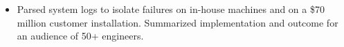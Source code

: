 \documentclass[12pt,letterpaper]{article}
\newcommand{\CPP}{C\nolinebreak[4]\hspace{-.05em}\raisebox{.22ex}{\footnotesize\bf ++}\xspace}
\begin{document}
\begin{itemize}[leftmargin=\parindent]
\begin{itemize}[leftmargin=\parindent]



            \item Parsed system logs to isolate failures on in-house machines and on a \$70 million customer installation. Summarized implementation and outcome for an audience of 50+ engineers. 








\end{itemize}
\end{itemize}
\end{document}
